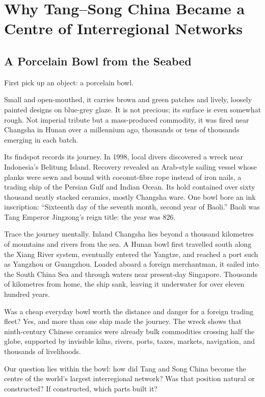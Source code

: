 \chapter[Tang--Song Regional Networks]{Why Tang--Song China Became a Centre of Interregional Networks}
\section{A Porcelain Bowl from the Seabed}
First pick up an object: a porcelain bowl.

Small and open-mouthed, it carries brown and green patches and lively, loosely painted designs on blue-grey glaze. It is not precious; its surface is even somewhat rough. Not imperial tribute but a mass-produced commodity, it was fired near Changsha in Hunan over a millennium ago, thousands or tens of thousands emerging in each batch.

Its findspot records its journey. In 1998, local divers discovered a wreck near Indonesia's Belitung Island. Recovery revealed an Arab-style sailing vessel whose planks were sewn and bound with coconut-fibre rope instead of iron nails, a trading ship of the Persian Gulf and Indian Ocean. Its hold contained over sixty thousand neatly stacked ceramics, mostly Changsha ware. One bowl bore an ink inscription: ``Sixteenth day of the seventh month, second year of Baoli.'' Baoli was Tang Emperor Jingzong's reign title: the year was 826.

Trace the journey mentally. Inland Changsha lies beyond a thousand kilometres of mountains and rivers from the sea. A Hunan bowl first travelled south along the Xiang River system, eventually entered the Yangtze, and reached a port such as Yangzhou or Guangzhou. Loaded aboard a foreign merchantman, it sailed into the South China Sea and through waters near present-day Singapore. Thousands of kilometres from home, the ship sank, leaving it underwater for over eleven hundred years.

Was a cheap everyday bowl worth the distance and danger for a foreign trading fleet? Yes, and more than one ship made the journey. The wreck shows that ninth-century Chinese ceramics were already bulk commodities crossing half the globe, supported by invisible kilns, rivers, ports, taxes, markets, navigation, and thousands of livelihoods.

Our question lies within the bowl: how did Tang and Song China become the centre of the world's largest interregional network? Was that position natural or constructed? If constructed, which parts built it?


